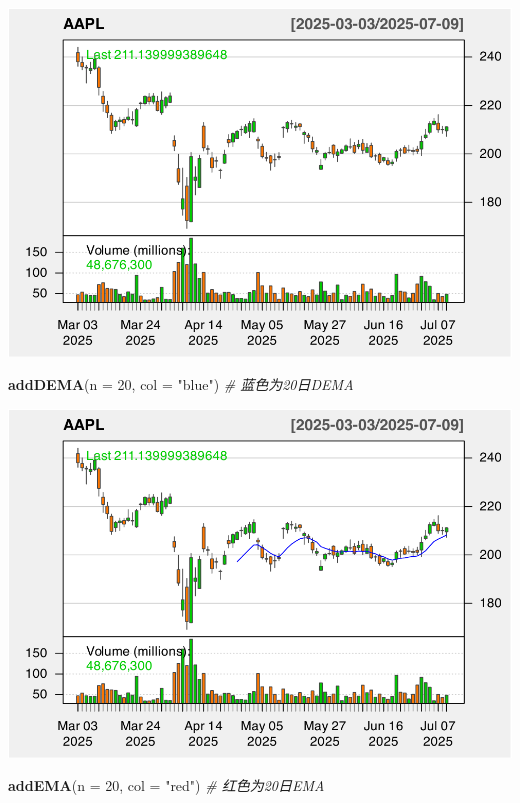 \documentclass[]{ctexbook}
\newenvironment{Shaded}{\begin{snugshade}}{\end{snugshade}}
\newcommand{\AttributeTok}[1]{\textcolor[rgb]{0.13,0.29,0.53}{#1}}
\newcommand{\CommentTok}[1]{\textcolor[rgb]{0.56,0.35,0.01}{\textit{#1}}}
\newcommand{\DecValTok}[1]{\textcolor[rgb]{0.00,0.00,0.81}{#1}}
\newcommand{\FunctionTok}[1]{\textcolor[rgb]{0.13,0.29,0.53}{\textbf{#1}}}
\newcommand{\NormalTok}[1]{#1}
\newcommand{\StringTok}[1]{\textcolor[rgb]{0.31,0.60,0.02}{#1}}
\begin{document}
\includegraphics[width=0.9\linewidth]{quantmod_files/figure-latex/dema_2-1}

\begin{Shaded}
\begin{Highlighting}[]
\FunctionTok{addDEMA}\NormalTok{(}\AttributeTok{n =} \DecValTok{20}\NormalTok{, }\AttributeTok{col =} \StringTok{"blue"}\NormalTok{)    }\CommentTok{\# 蓝色为20日DEMA}
\end{Highlighting}
\end{Shaded}

\includegraphics[width=0.9\linewidth]{quantmod_files/figure-latex/dema_2-2}

\begin{Shaded}
\begin{Highlighting}[]
\FunctionTok{addEMA}\NormalTok{(}\AttributeTok{n =} \DecValTok{20}\NormalTok{, }\AttributeTok{col =} \StringTok{"red"}\NormalTok{)      }\CommentTok{\# 红色为20日EMA}
\end{Highlighting}
\end{Shaded}
\end{document}
